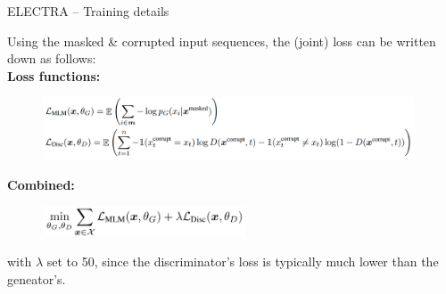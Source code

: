 \begin{frame}{ELECTRA -- Training details}

\vfill

	Using the masked \& corrupted input sequences, the (joint) loss can be written down as follows:\\
	\vspace{.3cm}
	\textbf{Loss functions:}
	\begin{figure}
		\centering
		\includegraphics[width = 11cm]{figure/electra-loss.png}
	\end{figure}
	
	\textbf{Combined:}
	\begin{figure}
		\centering
		\includegraphics[width = 6cm]{figure/electra-loss-comb.png}
	\end{figure}
	{\footnotesize with $\lambda$ set to 50, since the discriminator's loss is typically much lower than the geneator's.}
	
\vfill

\end{frame}


